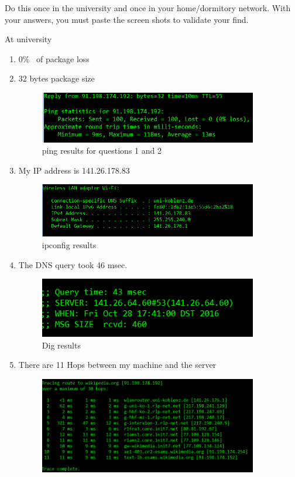 \documentclass{WeSTassignment}
\begin{document}
Do this once in the university and once in your home/dormitory network. With your answers, you must paste the screen shots to validate your find.

At university 
\begin{enumerate}
\itemsep0em
\item  0\% \ of package loss\
\item 32 bytes package size
\begin{figure}[h]
  \centering
  \includegraphics[width=0.9\textwidth]{ping.png}
   \caption{ping results for questions 1 and 2}
     \label{fig:ping}
\end{figure}
\item My IP address is 141.26.178.83
\begin{figure}[h]
  \centering
  \includegraphics[width=0.9\textwidth]{my_ip.png}
   \caption{ipconfig results}
     \label{fig:ipconfig}
\end{figure}
\item The DNS query took 46 msec.
\begin{figure}[h]
  \centering
  \includegraphics[width=0.9\textwidth]{dig.png}
   \caption{Dig results}
     \label{fig:dig}
\end{figure}
\item There are 11 Hops between my machine and the server
\begin{figure}[h]
  \centering
  \includegraphics[width=0.9\textwidth]{tracert.png}

\end{figure}
\end{enumerate}
\end{document}
